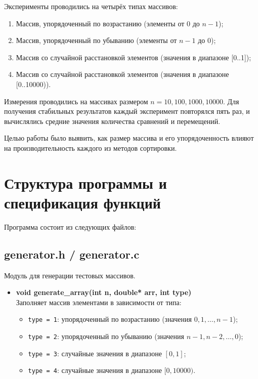 \documentclass[a4paper,12pt,titlepage]{article}
\begin{document}
Эксперименты проводились на четырёх типах массивов:
\begin{enumerate}
    \item Массив, упорядоченный по возрастанию (элементы от 0 до $n-1$);
    \item Массив, упорядоченный по убыванию (элементы от $n-1$ до 0);
    \item Массив со случайной расстановкой элементов (значения в диапазоне [0..1]);
    \item Массив со случайной расстановкой элементов (значения в диапазоне [0..10000)).
\end{enumerate}

Измерения проводились на массивах размером $n = 10, 100, 1000, 10000$. Для получения стабильных результатов каждый эксперимент повторялся пять раз, и вычислялись средние значения количества сравнений и перемещений.

Целью работы было выявить, как размер массива и его упорядоченность влияют на производительность каждого из методов сортировки.

\newpage

\section{Структура программы и спецификация функций}

Программа состоит из следующих файлов:

\subsection{generator.h / generator.c}

Модуль для генерации тестовых массивов.

\begin{itemize}
    \item \textbf{void generate\_array(int n, double* arr, int type)} \\
    Заполняет массив элементами в зависимости от типа:
    \begin{itemize}
        \item \texttt{type = 1}: упорядоченный по возрастанию (значения $0, 1, \ldots, n-1$);
        \item \texttt{type = 2}: упорядоченный по убыванию (значения $n-1, n-2, \ldots, 0$);
        \item \texttt{type = 3}: случайные значения в диапазоне $[0, 1]$;
        \item \texttt{type = 4}: случайные значения в диапазоне $[0, 10000)$.
    \end{itemize}
\end{itemize}
\end{document}
